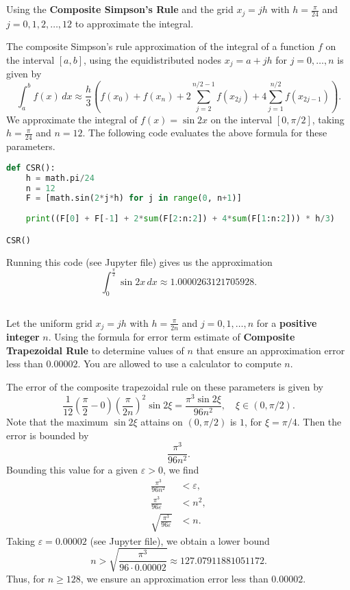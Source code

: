 \documentclass[12pt]{article}
\newenvironment{problem}
    {\begin{lrbox}{\mybox}\begin{minipage}{0.98\textwidth}}
    {\end{minipage}\end{lrbox}\framebox[\textwidth]{\usebox{\mybox}}}
\newcommand{\eps}{\varepsilon}
\newcommand{\<}{\left\langle}
\renewcommand{\>}{\right\rangle}
\begin{document}
\newpage
\subsection{}
\begin{problem}
    Using the \textbf{Composite Simpson's Rule} and the grid $x_j = jh$ with $h = \frac{\pi}{24}$ and $j = 0, 1, 2, \dots, 12$ to approximate the integral.
\end{problem}
\medskip

The composite Simpson's rule approximation of the integral of a function $f$ on the interval $[a, b]$, using the equidistributed nodes $x_j = a + jh$ for $j = 0, \dots, n$ is given by
\[
    \int_a^b f(x) \,dx
        \approx \frac{h}{3} \left(
            f(x_0) + f(x_n) + 2 \sum_{j = 2}^{n/2 - 1} f(x_{2j}) + 4 \sum_{j = 1}^{n/2} f(x_{2j - 1})
        \right).
\]
We approximate the integral of $f(x) = \sin 2x$ on the interval $[0, \pi/2]$, taking $h = \frac{\pi}{24}$ and $n = 12$. The following code evaluates the above formula for these parameters.
\begin{lstlisting}[language=Python]
def CSR():
    h = math.pi/24
    n = 12
    F = [math.sin(2*j*h) for j in range(0, n+1)]
    
    print((F[0] + F[-1] + 2*sum(F[2:n:2]) + 4*sum(F[1:n:2])) * h/3)

CSR()
\end{lstlisting}
Running this code (see Jupyter file) gives us the approximation
\[
    \int_0^{\frac{\pi}{2}} \sin 2x \,dx \approx 1.0000263121705928.
\]


\newpage
\subsection{}
\begin{problem}
    Let the uniform grid $x_j = jh$ with $h = \frac{\pi}{2n}$ and $j = 0, 1, \dots, n$ for a \textbf{positive integer} $n$. Using the formula for error term estimate of \textbf{Composite Trapezoidal Rule} to determine values of $n$ that ensure an approximation error less than $0.00002$. You are allowed to use a calculator to compute $n$.
\end{problem}
\medskip

The error of the composite trapezoidal rule on these parameters is given by
\[
    \frac{1}{12} \left( \frac{\pi}{2} - 0 \right) \left( \frac{\pi}{2n} \right)^2 \sin 2 \xi = \frac{\pi^3 \sin 2\xi}{96 n^2}, \quad \xi \in (0, \pi/2).
\]
Note that the maximum $\sin 2 \xi$ attains on $(0, \pi/2)$ is $1$, for $\xi = \pi/4$. Then the error is bounded by
\[
    \frac{\pi^3}{96 n^2}.
\]
Bounding this value for a given $\eps > 0$, we find
\begin{align*}
    \frac{\pi^3}{96 n^2} &< \eps, \\[1em]
    \frac{\pi^3}{96 \eps} &< n^2, \\[1em]
    \sqrt{\frac{\pi^3}{96 \eps}} &< n.
\end{align*}
Taking $\eps = 0.00002$ (see Jupyter file), we obtain a lower bound
\[
    n > \sqrt{\frac{\pi^3}{96 \cdot 0.00002}} \approx 127.07911881051172.
\]
Thus, for $n \geq 128$, we ensure an approximation error less than $0.00002$.
\end{document}
